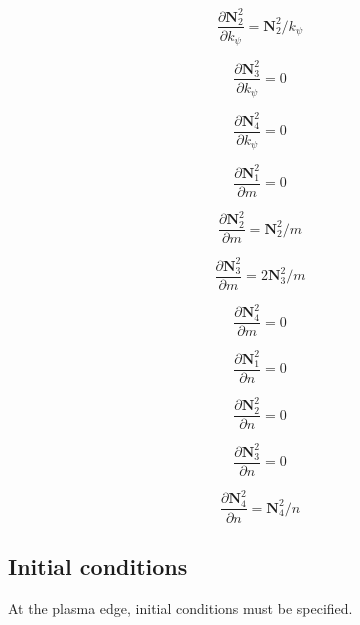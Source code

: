 \documentclass[a4paper,12pt]{article}%
\begin{document}
\begin{equation}
\frac{\partial\mathbf{N}_{2}^{2}}{\partial k_{\psi}}=\mathbf{N}_{2}%
^{2}/k_{\psi}%
\end{equation}
%

\begin{equation}
\frac{\partial\mathbf{N}_{3}^{2}}{\partial k_{\psi}}=0
\end{equation}
%

\begin{equation}
\frac{\partial\mathbf{N}_{4}^{2}}{\partial k_{\psi}}=0
\end{equation}
%

\begin{equation}
\frac{\partial\mathbf{N}_{1}^{2}}{\partial m}=0
\end{equation}
%

\begin{equation}
\frac{\partial\mathbf{N}_{2}^{2}}{\partial m}=\mathbf{N}_{2}^{2}/m
\end{equation}
%

\begin{equation}
\frac{\partial\mathbf{N}_{3}^{2}}{\partial m}=2\mathbf{N}_{3}^{2}/m
\end{equation}
%

\begin{equation}
\frac{\partial\mathbf{N}_{4}^{2}}{\partial m}=0
\end{equation}
%

\begin{equation}
\frac{\partial\mathbf{N}_{1}^{2}}{\partial n}=0
\end{equation}
%

\begin{equation}
\frac{\partial\mathbf{N}_{2}^{2}}{\partial n}=0
\end{equation}
%

\begin{equation}
\frac{\partial\mathbf{N}_{3}^{2}}{\partial n}=0
\end{equation}
%

\begin{equation}
\frac{\partial\mathbf{N}_{4}^{2}}{\partial n}=\mathbf{N}_{4}^{2}/n
\end{equation}


\subsection{Initial conditions}

\bigskip At the plasma edge, initial conditions must be specified.
\end{document}
